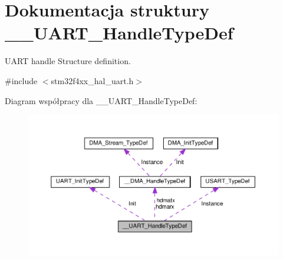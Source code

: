 \hypertarget{struct_____u_a_r_t___handle_type_def}{}\section{Dokumentacja struktury \+\_\+\+\_\+\+U\+A\+R\+T\+\_\+\+Handle\+Type\+Def}
\label{struct_____u_a_r_t___handle_type_def}


U\+A\+RT handle Structure definition.  




{\ttfamily \#include $<$stm32f4xx\+\_\+hal\+\_\+uart.\+h$>$}



Diagram współpracy dla \+\_\+\+\_\+\+U\+A\+R\+T\+\_\+\+Handle\+Type\+Def\+:\nopagebreak
\begin{figure}[H]
\begin{center}
\leavevmode
\includegraphics[width=350pt]{struct_____u_a_r_t___handle_type_def__coll__graph}
\end{center}
\end{figure}
